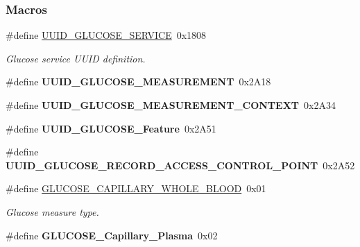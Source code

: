\subsubsection*{Macros}
\begin{DoxyCompactItemize}
\item 
\#define \hyperlink{group___b_l_e___g_s_ga36f6166b882cf501eb460cdbf4b20aa0}{U\+U\+I\+D\+\_\+\+G\+L\+U\+C\+O\+S\+E\+\_\+\+S\+E\+R\+V\+I\+CE}~0x1808\hypertarget{group___b_l_e___g_s_ga36f6166b882cf501eb460cdbf4b20aa0}{}\label{group___b_l_e___g_s_ga36f6166b882cf501eb460cdbf4b20aa0}

\begin{DoxyCompactList}\small\item\em Glucose service U\+U\+ID definition. \end{DoxyCompactList}\item 
\#define {\bfseries U\+U\+I\+D\+\_\+\+G\+L\+U\+C\+O\+S\+E\+\_\+\+M\+E\+A\+S\+U\+R\+E\+M\+E\+NT}~0x2\+A18\hypertarget{group___b_l_e___g_s_ga62e73ff7f2beafb08e0dfadbbb7ff5e6}{}\label{group___b_l_e___g_s_ga62e73ff7f2beafb08e0dfadbbb7ff5e6}

\item 
\#define {\bfseries U\+U\+I\+D\+\_\+\+G\+L\+U\+C\+O\+S\+E\+\_\+\+M\+E\+A\+S\+U\+R\+E\+M\+E\+N\+T\+\_\+\+C\+O\+N\+T\+E\+XT}~0x2\+A34\hypertarget{group___b_l_e___g_s_ga88f8b7b4b794cf84e482fc9393618d4e}{}\label{group___b_l_e___g_s_ga88f8b7b4b794cf84e482fc9393618d4e}

\item 
\#define {\bfseries U\+U\+I\+D\+\_\+\+G\+L\+U\+C\+O\+S\+E\+\_\+\+Feature}~0x2\+A51\hypertarget{group___b_l_e___g_s_ga29eb1a62b4f81ee8e91c9a4fb005765b}{}\label{group___b_l_e___g_s_ga29eb1a62b4f81ee8e91c9a4fb005765b}

\item 
\#define {\bfseries U\+U\+I\+D\+\_\+\+G\+L\+U\+C\+O\+S\+E\+\_\+\+R\+E\+C\+O\+R\+D\+\_\+\+A\+C\+C\+E\+S\+S\+\_\+\+C\+O\+N\+T\+R\+O\+L\+\_\+\+P\+O\+I\+NT}~0x2\+A52\hypertarget{group___b_l_e___g_s_gaaa4175a8747ed3e0b2f322d50aae63ff}{}\label{group___b_l_e___g_s_gaaa4175a8747ed3e0b2f322d50aae63ff}

\item 
\#define \hyperlink{group___b_l_e___g_s_ga4e69f6712d805dfb0e4804298c428f62}{G\+L\+U\+C\+O\+S\+E\+\_\+\+C\+A\+P\+I\+L\+L\+A\+R\+Y\+\_\+\+W\+H\+O\+L\+E\+\_\+\+B\+L\+O\+OD}~0x01\hypertarget{group___b_l_e___g_s_ga4e69f6712d805dfb0e4804298c428f62}{}\label{group___b_l_e___g_s_ga4e69f6712d805dfb0e4804298c428f62}

\begin{DoxyCompactList}\small\item\em Glucose measure type. \end{DoxyCompactList}\item 
\#define {\bfseries G\+L\+U\+C\+O\+S\+E\+\_\+\+Capillary\+\_\+\+Plasma}~0x02\hypertarget{group___b_l_e___g_s_gaf3d3cac17408368e46cb422a001a6ed0}{}\label{group___b_l_e___g_s_gaf3d3cac17408368e46cb422a001a6ed0}


\end{DoxyCompactItemize}
